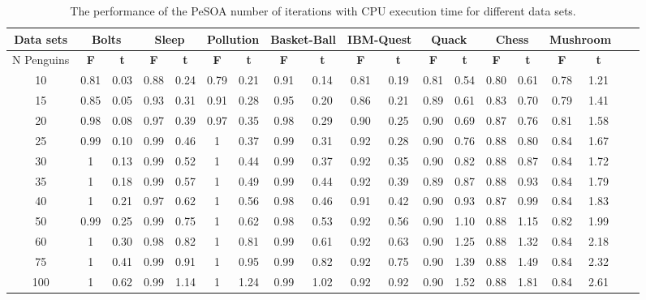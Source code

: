 \documentclass[preprint,12pt]{elsarticle}
\begin{document}
\begin{landscape}
\begin{table}[b]
\caption{The performance of the PeSOA number of iterations with CPU execution time for different data sets.}
\label{sample-table}
\begin{tabular}{c c c c c c c c c c c c c c c c c c c}
\toprule
\textbf{Data sets} &  \multicolumn{2}{c}{Bolts} & \multicolumn{2}{c}{Sleep} & \multicolumn{2}{c}{Pollution}& \multicolumn{2}{c}{Basket-Ball}& \multicolumn{2}{c}{IBM-Quest}& \multicolumn{2}{c}{Quack}& \multicolumn{2}{c}{Chess}& \multicolumn{2}{c}{Mushroom}\\\midrule
{N Penguins}   & \textbf{F}  & \textbf{t}  & \textbf{F}  & \textbf{t} & \textbf{F}  & \textbf{t} & \textbf{F}  & \textbf{t} & \textbf{F}  & \textbf{t} & \textbf{F}  & \textbf{t} & \textbf{F}  & \textbf{t} & \textbf{F}  & \textbf{t} \\\hline                      
10		&		0.81 & 	0.03		& 		0.88 & 	0.24	&		0.79 & 0.21	&		0.91 & 	0.14		&	 0.81 &	0.19	& 0.81 &  0.54 &	0.80 &	0.61  &	0.78 & 	1.21 \\\hline
15		&		0.85 & 	0.05		& 		0.93 & 	0.31	&		0.91 & 0.28	&		0.95 & 	0.20		&	 0.86 & 0.21	& 0.89 &  0.61 &	0.83 &	0.70  &	0.79 &	1.41 \\\hline
20    &		0.98 & 	0.08		& 		0.97 & 	0.39	&		0.97 & 0.35	&		0.98 & 	0.29		&	 0.90 &	0.25	& 0.90 &  0.69 &	0.87 &	0.76  &	0.81 &  1.58	 \\\hline
25		&		0.99 & 	0.10		& 		0.99 & 	0.46	&		1    & 0.37	&	  0.99 & 	0.31	  &	 0.92 &	0.28	& 0.90 &  0.76 &	0.88 &  0.80  &	0.84 & 	1.67 \\\hline
30		&	  1    & 	0.13		& 		0.99 & 	0.52  &		1    & 0.44	&		0.99 & 	0.37		&	 0.92 &	0.35	& 0.90 &  0.82 &	0.88 &  0.87  &	0.84 &  1.72 \\\hline
35	  &		1    & 	0.18	  & 		0.99 & 	0.57	&		1    & 0.49	&		0.99 & 	0.44 	  &	 0.92 &	0.39	& 0.89 &  0.87 &	0.88 &  0.93  & 0.84 & 	1.79 \\\hline
40	  &		1    & 	0.21		& 		0.97 & 	0.62  &		1    & 0.56	&		0.98 & 	0.46		&	 0.91 &	0.42  & 0.90 &  0.93 &	0.87 &	0.99  &	0.84 & 	1.83 \\\hline
50		&		0.99 & 	0.25	  & 		0.99 & 	0.75	&		1    & 0.62	& 	0.98 & 	0.53		&	 0.92 &	0.56  & 0.90 &  1.10 &	0.88 &	1.15  &	0.82 & 	1.99 \\\hline
60		&		1    & 	0.30		& 		0.98 & 	0.82  &		1    & 0.81	&		0.99 & 	0.61		&	 0.92 &	0.63  & 0.90 &  1.25 &	0.88 &	1.32  &	0.84 & 	2.18 \\\hline
75		&		1    & 	0.41		& 		0.99 & 	0.91	&		1    & 0.95	&		0.99 & 	0.82		&	 0.92 &	0.75  & 0.90 &  1.39 &	0.88 &	1.49 &	0.84 & 	2.32 \\\hline
100		&		1    &  0.62		& 	  0.99 & 	1.14  &		1    & 1.24	&		0.99 & 	1.02		&	 0.92&	0.92  & 0.90 &  1.52 &  0.88 &	1.81 &	0.84 & 	2.61 \\\hline
\bottomrule
\end{tabular}
\end{table}

\end{landscape}
\end{document}
